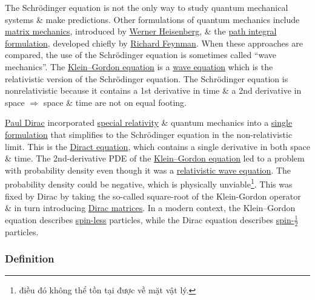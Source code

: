 \documentclass{article}
\begin{document}
The Schrödinger equation is not the only way to study quantum mechanical systems \& make predictions. Other formulations of quantum mechanics include \href{https://en.wikipedia.org/wiki/Matrix_mechanics}{matrix mechanics}, introduced by \href{https://en.wikipedia.org/wiki/Werner_Heisenberg}{\sc Werner Heisenberg}, \& the \href{https://en.wikipedia.org/wiki/Path_integral_formulation}{path integral formulation}, developed chiefly by \href{https://en.wikipedia.org/wiki/Richard_Feynman}{\sc Richard Feynman}. When these approaches are compared, the use of the Schrödinger equation is sometimes called ``wave mechanics''. The \href{https://en.wikipedia.org/wiki/Klein%E2%80%93Gordon_equation}{Klein--Gordon equation} is a \href{https://en.wikipedia.org/wiki/Wave_equation}{wave equation} which is the relativistic version of the Schrödinger equation. The Schrödinger equation is nonrelativistic because it contains a 1st derivative in time \& a 2nd derivative in space $\Rightarrow$ space \& time are not on equal footing.

\href{https://en.wikipedia.org/wiki/Paul_Dirac}{\sc Paul Dirac} incorporated \href{https://en.wikipedia.org/wiki/Special_relativity}{special relativity} \& quantum mechanics into a \href{https://en.wikipedia.org/wiki/Dirac_equation}{single formulation} that simplifies to the Schrödinger equation in the non-relativistic limit. This is the \href{https://en.wikipedia.org/wiki/Dirac_equation}{Diract equation}, which contains a single derivative in both space \& time. The 2nd-derivative PDE of the \href{https://en.wikipedia.org/wiki/Klein%E2%80%93Gordon_equation}{Klein--Gordon equation} led to a problem with probability density even though it was a \href{https://en.wikipedia.org/wiki/Relativistic_wave_equations}{relativistic wave equation}. The probability density could be negative, which is physically unviable\footnote{điều đó không thể tồn tại được về mặt vật lý.}. This was fixed by {\sc Dirac} by taking the so-called square-root of the Klein-Gordon operator \& in turn introducing \href{https://en.wikipedia.org/wiki/Gamma_matrices}{Dirac matrices}. In a modern context, the Klein--Gordon equation describes \href{https://en.wikipedia.org/wiki/Scalar_boson}{spin-less} particles, while the Dirac equation describes \href{https://en.wikipedia.org/wiki/Fermion}{spin-$\frac{1}{2}$} particles.

\subsubsection{Definition}
\end{document}
